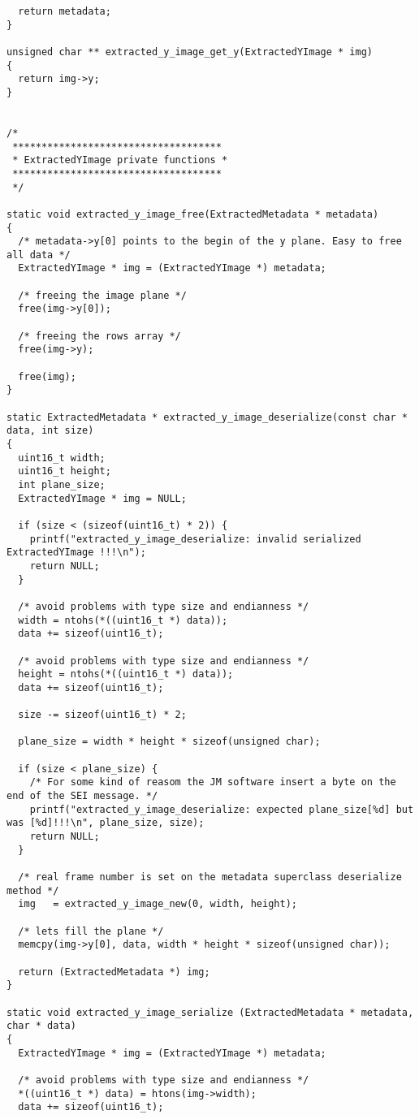 \begin{lstlisting}
  return metadata;
}

unsigned char ** extracted_y_image_get_y(ExtractedYImage * img)
{
  return img->y;
}


/*
 ************************************
 * ExtractedYImage private functions *
 ************************************
 */

static void extracted_y_image_free(ExtractedMetadata * metadata)
{
  /* metadata->y[0] points to the begin of the y plane. Easy to free all data */
  ExtractedYImage * img = (ExtractedYImage *) metadata;

  /* freeing the image plane */
  free(img->y[0]);

  /* freeing the rows array */
  free(img->y);

  free(img);
}

static ExtractedMetadata * extracted_y_image_deserialize(const char * data, int size)
{
  uint16_t width;
  uint16_t height;
  int plane_size;
  ExtractedYImage * img = NULL; 

  if (size < (sizeof(uint16_t) * 2)) {
    printf("extracted_y_image_deserialize: invalid serialized ExtractedYImage !!!\n");
    return NULL;
  }

  /* avoid problems with type size and endianness */
  width = ntohs(*((uint16_t *) data));
  data += sizeof(uint16_t);

  /* avoid problems with type size and endianness */
  height = ntohs(*((uint16_t *) data));
  data += sizeof(uint16_t);

  size -= sizeof(uint16_t) * 2;

  plane_size = width * height * sizeof(unsigned char);

  if (size < plane_size) {
    /* For some kind of reasom the JM software insert a byte on the end of the SEI message. */
    printf("extracted_y_image_deserialize: expected plane_size[%d] but was [%d]!!!\n", plane_size, size);
    return NULL;
  }

  /* real frame number is set on the metadata superclass deserialize method */
  img   = extracted_y_image_new(0, width, height);

  /* lets fill the plane */
  memcpy(img->y[0], data, width * height * sizeof(unsigned char));

  return (ExtractedMetadata *) img;
}

static void extracted_y_image_serialize (ExtractedMetadata * metadata, char * data)
{
  ExtractedYImage * img = (ExtractedYImage *) metadata;

  /* avoid problems with type size and endianness */
  *((uint16_t *) data) = htons(img->width);
  data += sizeof(uint16_t);


\end{lstlisting}
